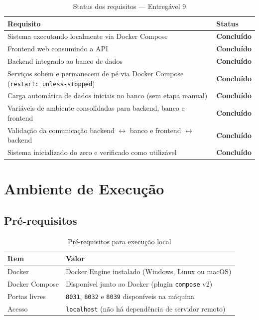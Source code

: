 \documentclass[12pt, a4paper]{article}
\newcommand{\thead}[1]{\cellcolor{tableheader}\color{white}\bfseries #1}
\newcommand{\talt}{\rowcolor{tablerowalt}}
\newcommand{\tok}{\textcolor{successgreen}{\textbf{Concluído}}}
\begin{document}
\begin{table}[H]
\centering
\begin{tabularx}{\textwidth}{|X|l|}
\hline
\thead{Requisito} & \thead{Status} \\
\hline
Sistema executando localmente via Docker Compose & \tok \\
\talt Frontend web consumindo a API & \tok \\
Backend integrado ao banco de dados & \tok \\
\talt Serviços sobem e permanecem de pé via Docker Compose (\texttt{restart: unless-stopped}) & \tok \\
Carga automática de dados iniciais no banco (sem etapa manual) & \tok \\
\talt Variáveis de ambiente consolidadas para backend, banco e frontend & \tok \\
Validação da comunicação backend $\leftrightarrow$ banco e frontend $\leftrightarrow$ backend & \tok \\
\talt Sistema inicializado do zero e verificado como utilizável & \tok \\
\hline
\end{tabularx}
\caption{Status dos requisitos — Entregável 9}
\end{table}

\section{Ambiente de Execução}

\subsection{Pré-requisitos}

\begin{table}[H]
\centering
\begin{tabularx}{\textwidth}{|l|X|}
\hline
\thead{Item} & \thead{Valor} \\
\hline
Docker           & Docker Engine instalado (Windows, Linux ou macOS) \\
\talt Docker Compose & Disponível junto ao Docker (plugin \texttt{compose} v2) \\
Portas livres    & \texttt{8031}, \texttt{8032} e \texttt{8039} disponíveis na máquina \\
\talt Acesso         & \texttt{localhost} (não há dependência de servidor remoto) \\
\hline
\end{tabularx}
\caption{Pré-requisitos para execução local}
\end{table}
\end{document}
